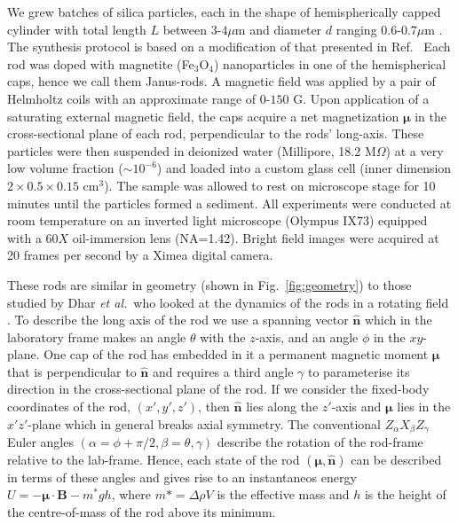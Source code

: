 \documentclass[aps,prl,twocolumn,superscriptaddress]{revtex4-1}
\newcommand{\vcrm}[1]{\mathbf{#1}}
\newcommand{\hvcrm}[1]{\mathbf{\hat{#1}}}
\newcommand{\vc}[1]{\boldsymbol{#1}}
\newcommand{\vm}{\vc{\mu}}
\newcommand{\vn}{\hvcrm{n}}
\begin{document}
%
%
%
%
%
%
%
We grew batches of silica particles, each in the shape of hemispherically capped cylinder with total length $L$ between $3$-$4  \mu$m and diameter $d$ ranging $0.6$-$0.7 \mu$m \cite{Gao15}. The synthesis protocol is based on a modification of that presented in Ref.\ \cite{Kuijk2011} Each rod was doped with magnetite (Fe$_3$O$_4$) nanoparticles in one of the hemispherical caps, hence we call them Janus-rods. A magnetic field was applied by a pair of Helmholtz coils with an approximate range of $0$-$150$ G. Upon application of a saturating external magnetic field, the caps acquire a net magnetization $\vc{\mu}$ in the cross-sectional plane of each rod, perpendicular to the rods' long-axis. These particles were then suspended in deionized water (Millipore, 18.2 M$\Omega$) at a very low volume fraction ($\sim 10^{-6}$) and loaded into a custom glass cell (inner dimension $2\times0.5\times0.15$ cm$^3$). The sample was allowed to rest on microscope stage for 10 minutes until the particles formed a sediment. All experiments were conducted at room temperature on an inverted light microscope (Olympus IX73) equipped with a $60X$ oil-immersion lens (NA=1.42). Bright field images were acquired at 20 frames per second by a Ximea digital camera.

These rods are similar in geometry (shown in Fig.\ \ref{fig:geometry}) to those studied by Dhar \emph{et al.}\ who looked at the dynamics of the rods in a rotating field \cite{Dhar2007}. To describe the long axis of the rod we use a spanning vector $\hvcrm{n}$ which in the laboratory frame makes an angle $\theta$ with the $z$-axis, and an angle $\phi$ in the $xy$-plane. One cap of the rod has embedded in it a permanent magnetic moment $\vc{\mu}$ that is perpendicular to $\hvcrm{n}$ and requires a third angle $\gamma$ to parameterise its direction in the cross-sectional plane of the rod. If we consider the fixed-body coordinates of the rod, $(x',y',z')$, then $\hvcrm{n}$ lies along the $z'$-axis and $\vc{\mu}$ lies in the $x'z'$-plane which in general breaks axial symmetry. The conventional $Z_\alpha X_\beta Z_\gamma$ Euler angles $(\alpha=\phi+\pi/2, \beta=\theta, \gamma)$ describe the rotation of the rod-frame relative to the lab-frame. Hence, each state of the rod $(\vm,\vn)$ can be described in terms of these angles and gives rise to an instantaneos energy $U=-\vc{\mu}\cdot\vcrm{B} - m^*gh$, where $m*=\Delta\rho V$ is the effective mass and $h$ is the height of the centre-of-mass of the rod above its minimum.
\end{document}
